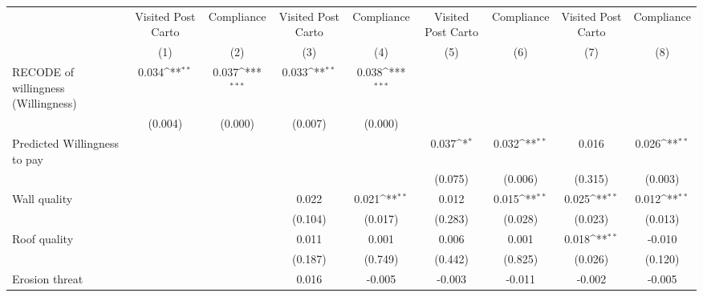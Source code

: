 {
\def\sym#1{\ifmmode^{#1}\else\(^{#1}\)\fi}
\begin{tabular}{l*{8}{c}}
\toprule
                &\multicolumn{1}{c}{Visited Post Carto}&\multicolumn{1}{c}{Compliance}&\multicolumn{1}{c}{Visited Post Carto}&\multicolumn{1}{c}{Compliance}&\multicolumn{1}{c}{Visited Post Carto}&\multicolumn{1}{c}{Compliance}&\multicolumn{1}{c}{Visited Post Carto}&\multicolumn{1}{c}{Compliance}\\
                &\multicolumn{1}{c}{(1)}         &\multicolumn{1}{c}{(2)}         &\multicolumn{1}{c}{(3)}         &\multicolumn{1}{c}{(4)}         &\multicolumn{1}{c}{(5)}         &\multicolumn{1}{c}{(6)}         &\multicolumn{1}{c}{(7)}         &\multicolumn{1}{c}{(8)}         \\
\midrule
RECODE of willingness (Willingness)&    0.034\sym{**} &    0.037\sym{***}&    0.033\sym{**} &    0.038\sym{***}&                  &                  &                  &                  \\
                &  (0.004)         &  (0.000)         &  (0.007)         &  (0.000)         &                  &                  &                  &                  \\
Predicted Willingness to pay&                  &                  &                  &                  &    0.037\sym{*}  &    0.032\sym{**} &    0.016         &    0.026\sym{**} \\
                &                  &                  &                  &                  &  (0.075)         &  (0.006)         &  (0.315)         &  (0.003)         \\
Wall quality    &                  &                  &    0.022         &    0.021\sym{**} &    0.012         &    0.015\sym{**} &    0.025\sym{**} &    0.012\sym{**} \\
                &                  &                  &  (0.104)         &  (0.017)         &  (0.283)         &  (0.028)         &  (0.023)         &  (0.013)         \\
Roof quality    &                  &                  &    0.011         &    0.001         &    0.006         &    0.001         &    0.018\sym{**} &   -0.010         \\
                &                  &                  &  (0.187)         &  (0.749)         &  (0.442)         &  (0.825)         &  (0.026)         &  (0.120)         \\
Erosion threat  &                  &                  &    0.016         &   -0.005         &   -0.003         &   -0.011         &   -0.002         &   -0.005         \\

\end{tabular}}
